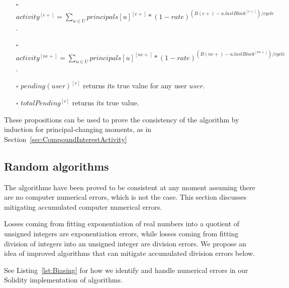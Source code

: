 \documentclass{article}
\begin{document}
\begin{itemize}

  \item[$\square$] $ activity^{[e+]} = \sum_{u \in U} principals[u]^{[e+]} * (1-rate )^{(B(e+)-u.lastBlock^{[e+]})/cycle}$.
  \newline

  \item[$\square$] $ activity^{[ne+]} = \sum_{u \in U} principals[u]^{[ne+]} * (1-rate )^{(B(ne+)-u.lastBlock^{[ne+]})/cycle}$.
  \newline

  \item[$\square$] { $ pending(user)^{[r]}$ returns its true value for any user $user$.}
  \newline

  \item[$\square$] { $ totalPending^{[r]} $ returns its true value.}
  \newline

\end{itemize}

These propositions can be used to prove the consistency of the algorithm by induction for 
principal-changing moments, as in Section~\ref{sec:CompoundInterestActivity}


\subsection{Random algorithms}
\label{sec:RandomAlgorithms}

The algorithms have been proved to be consistent at any moment assuming there are 
no computer numerical errors, which is not the case.
This section discusses mitigating accumulated computer numerical errors.

Losses coming from fitting exponentiation 
of real numbers into a quotient of unsigned integers are exponentiation errors, 
while losses coming from fitting division of integers into 
an unsigned integer are division errors.
We propose an idea of improved algorithms that can 
mitigate accumulated division errors below.

See Listing~\ref{lst:Biasing} for how we identify and handle numerical errors 
in our Solidity implementation of algorithms.
\newline
\end{document}
